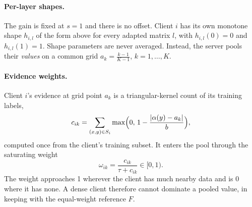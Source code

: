 \documentclass[11pt]{article}
\begin{document}
\paragraph{Per-layer shapes.}
The gain is fixed at $s=1$ and there is no offset.
Client $i$ has its own monotone shape $h_{i,l}$ of the form above for every adapted matrix $l$, with $h_{i,l}(0)=0$ and $h_{i,l}(1)=1$.
Shape parameters are never averaged.
Instead, the server pools their \emph{values} on a common grid $a_k=\frac{k-1}{K-1}$, $k=1,\dots,K$.

\paragraph{Evidence weights.}
Client $i$'s evidence at grid point $a_k$ is a triangular-kernel count of its training labels,
\begin{equation}
  c_{ik} = \sum_{(x,y)\in S_i} \max\Bigl(0,\, 1-\frac{\lvert \alpha(y)-a_k\rvert}{b}\Bigr),
\end{equation}
computed once from the client's training subset.
It enters the pool through the saturating weight
\begin{equation}
  \omega_{ik} = \frac{c_{ik}}{\tau + c_{ik}} \in [0,1).
\end{equation}
The weight approaches 1 wherever the client has much nearby data and is 0 where it has none.
A dense client therefore cannot dominate a pooled value, in keeping with the equal-weight reference $F$.
\end{document}
